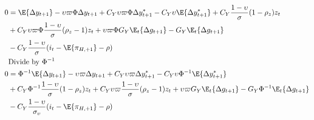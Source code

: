 \begin{align}
    0  &= \E \{ \Delta y_{t+1}\} -\upsilon \varpi \Phi \Delta y_{t+1} + C_Y \upsilon \varpi \Phi \Delta y^*_{t+1} - C_Y \upsilon \E \{\Delta y_{t+1}^* \} + C_Y\frac{1-\upsilon}{\sigma}(1-\rho_z)z_t \nonumber \\ 
    &+ C_Y \upsilon \varpi \Phi \frac{1-\upsilon}{\sigma} (\rho_z - 1)z_t + \upsilon \varpi\Phi G_Y \E_t\{\Delta g_{t+1}\} -G_Y \E_t\{\Delta g_{t+1}\} \nonumber \\ 
    &- C_Y\frac{1-\upsilon}{\sigma}(i_t - \E \{ \pi_{H,+1}\} - \rho)\\
    &\text{Divide by $\Phi^{-1}$}\nonumber\\
    0  &= \Phi^{-1} \E \{ \Delta y_{t+1}\} - \upsilon \varpi \Delta y_{t+1} + C_Y \upsilon \varpi \Delta y^*_{t+1} - C_Y\upsilon \Phi^{-1} \E \{\Delta y_{t+1}^* \} \nonumber\\
        &  +C_Y \Phi^{-1} \frac{1-\upsilon}{\sigma}(1-\rho_z)z_t + C_Y\upsilon \varpi \frac{1-\upsilon}{\sigma} (\rho_z - 1)z_t + \upsilon \varpi G_Y \E_t\{\Delta g_{t+1}\} -G_Y \Phi^{-1}\E_t\{\Delta g_{t+1}\}\nonumber\\
        &- C_Y \frac{1-\upsilon}{\sigma_\upsilon}(i_t - \E \{ \pi_{H,+1}\} - \rho)
\end{align}
